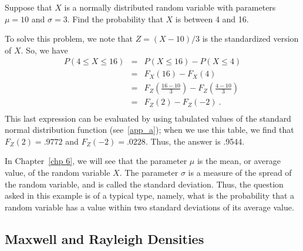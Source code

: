 \begin{example}\label{exam 5.16}
Suppose that $X$ is a normally distributed random variable with parameters $\mu = 10$ and
$\sigma = 3$.  Find the probability that $X$ is between 4 and 16.  
\par
To solve this problem, we note that $Z = (X-10)/3$ is the standardized version of $X$.
So, we have
\begin{eqnarray*}
P(4 \le X \le 16) & = & P(X \le 16) - P(X \le 4) \\
                  & = & F_X(16) - F_X(4) \\
                  & = & F_Z\left(\frac {16 - 10}3 \right) - F_Z\left(\frac {4-10}3 \right) \\
                  & = & F_Z(2) - F_Z(-2)\ . \\
\end{eqnarray*} 
This last expression can be evaluated by using tabulated values of the standard normal 
distribution function (see~\ref{app_a}); when we use this table, we find that $F_Z(2) = .9772$ 
and $F_Z(-2) = .0228$.  Thus, the answer is .9544.
\par
In Chapter~\ref{chp 6}, we will see that the parameter $\mu$ is the mean, or average
value, of the random variable $X$.  The parameter $\sigma$ is a measure of the spread of
the random variable, and is called the standard deviation.  Thus, the question asked in this
example is of a typical type, namely, what is the probability that a random variable has a value
within two standard deviations of its average value.
\end{example}

\subsection*{Maxwell and Rayleigh Densities}

